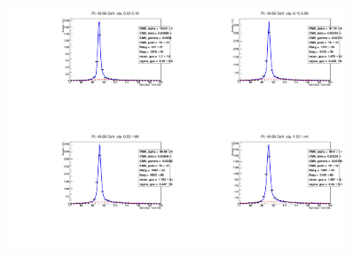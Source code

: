 \begin{figure}[htb]
  \begin{center}
   \includegraphics[width=0.45\textwidth]{../figs/figs_v11/ELECTRON_WGamma/EtoGammaFits/sa_hZmass_h_Data_EtoGamma_Enr_BARREL_pt45to55_ieta0_noWMtCut.pdf}\includegraphics[width=0.45\textwidth]{../figs/figs_v11/ELECTRON_WGamma/EtoGammaFits/sa_hZmass_h_Data_EtoGamma_Enr_BARREL_pt45to55_ieta1_noWMtCut.pdf}\\
   \includegraphics[width=0.45\textwidth]{../figs/figs_v11/ELECTRON_WGamma/EtoGammaFits/sa_hZmass_h_Data_EtoGamma_Enr_BARREL_pt45to55_ieta2_noWMtCut.pdf}\includegraphics[width=0.45\textwidth]{../figs/figs_v11/ELECTRON_WGamma/EtoGammaFits/sa_hZmass_h_Data_EtoGamma_Enr_BARREL_pt45to55_ieta3_noWMtCut.pdf}\\

\end{center}
\end{figure}
